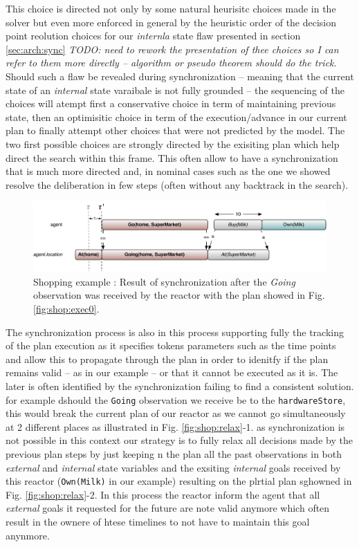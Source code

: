 This choice is directed not only by some natural heurisitc choices
made in the solver but even more enforced in general by the heuristic
order of the decision point reolution choices for our {\em internla}
state flaw presented in section \ref{sec:arch:sync} {\em\color{red}
  TODO: need to rework the presentation of thee choices so I can refer
  to them more directly -- algorithm or pseudo theorem should do the
  trick}. Should such a flaw be revealed during synchronization --
meaning that the current state of an {\em internal} state varaibale is
not fully grounded -- the sequencing of the choices will atempt first
a conservative choice in term of maintaining previous state, then an
optimisitic choice in term of the execution/advance in our current
plan to finally attempt other choices that were not predicted by the
model. The two first possible choices are strongly directed by the
exisiting plan which help direct the search within this frame. This
often allow to have a synchronization that is much more directed and, 
in nominal cases such as the one we showed resolve the deliberation 
in few steps (often without any backtrack in the search).

\begin{figure}[!htb]
  \centering
  \includegraphics[width=0.7\columnwidth]{figs/shoping_exec_t1}
  \caption{Shopping example : Result of synchronization after the {\em
      Going} observation was received by the reactor with the plan
    showed in Fig. \ref{fig:shop:exec0}.}
  \label{fig:shop:exec1}
\end{figure}

The synchronization process is also in this process supporting fully
the tracking of the plan execution as it specifies tokens parameters
such as the time points and allow this to propagate through the plan
in order to idenitfy if the plan remains valid -- as in our example --
or that it cannot be executed as it is. The later is often identified
by the synchronization failing to find a consistent solution. for
example dshould the \texttt{Going} observation we receive be to the
\texttt{hardwareStore}, this would break the current plan of our
reactor as we cannot go simultaneously at 2 different places as
illustrated in Fig. \ref{fig:shop:relax}-1. as synchronization is not
possible in this context our strategy is to fully relax all decisions
made by the previous plan steps by just keeping n the plan all the
past observations in both {\em external} and {\em internal} state
variables and the exsiting {\em internal} goals received by this
reactor (\texttt{Own(Milk)} in our example) resulting on the plrtial
plan sghowned in Fig. \ref{fig:shop:relax}-2. In this process the
reactor inform the agent that all {\em external} goals it requested
for the future are note valid anymore which often result in the ownere
of htese timelines to not have to maintain this goal anynmore.

